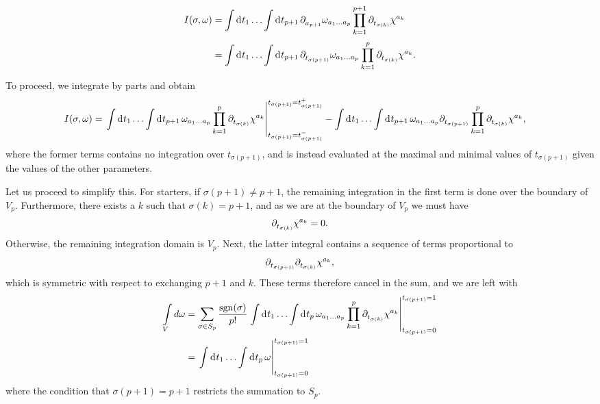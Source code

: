 \begin{align*}
I(\sigma, \omega) &= \integ{}{}{t_{1}}{\dots \integ{}{}{t_{p + 1}}{\del{a_{p + 1}}{\omega_{a_{1}\dots a_{p}}}\prod\limits_{k = 1}^{p + 1}\del{t_{\sigma(k)}}{\chi^{a_{k}}}}} \\
&= \integ{}{}{t_{1}}{\dots \integ{}{}{t_{p + 1}}{\del{t_{\sigma(p + 1)}}{\omega_{a_{1}\dots a_{p}}}\prod\limits_{k = 1}^{p}\del{t_{\sigma(k)}}{\chi^{a_{k}}}}}.
\end{align*}
To proceed, we integrate by parts and obtain
\begin{align*}
I(\sigma, \omega) &= \eval{\integ{}{}{t_{1}}{\dots \integ{}{}{t_{p + 1}}{\omega_{a_{1}\dots a_{p}}\prod\limits_{k = 1}^{p}\del{t_{\sigma(k)}}{\chi^{a_{k}}}}}}_{t_{\sigma(p + 1)} = t_{\sigma(p + 1)}^{-}}^{t_{\sigma(p + 1)} = t_{\sigma(p + 1)}^{+}} - \integ{}{}{t_{1}}{\dots \integ{}{}{t_{p + 1}}{\omega_{a_{1}\dots a_{p}}\del{t_{\sigma(p + 1)}}{\prod\limits_{k = 1}^{p}\del{t_{\sigma(k)}}{\chi^{a_{k}}}}}},
\end{align*}
where the former terms contains no integration over $t_{\sigma(p + 1)}$, and is instead evaluated at the maximal and minimal values of $t_{\sigma(p + 1)}$ given the values of the other parameters.

Let us proceed to simplify this. For starters, if $\sigma(p + 1) \neq p + 1$, the remaining integration in the first term is done over the boundary of $V_{p}$. Furthermore, there exists a $k$ such that $\sigma(k) = p + 1$, and as we are at the boundary of $V_{p}$ we must have
\begin{align*}
\partial^{}_{t_{\sigma(k)}}\chi^{a_{k}} = 0.
\end{align*}
Otherwise, the remaining integration domain is $V_{p}$. Next, the latter integral contains a sequence of terms proportional to
\begin{align*}
\partial^{}_{t_{\sigma(p + 1)}}\partial^{}_{t_{\sigma(k)}}\chi^{a_{k}},
\end{align*}
which is symmetric with respect to exchanging $p + 1$ and $k$. These terms therefore cancel in the sum, and we are left with
\begin{align*}
\minteg{V}{d\omega} &= \sum\limits_{\sigma\in S_{p}}\frac{\text{sgn}(\sigma)}{p!}\eval{\integ{}{}{t_{1}}{\dots \integ{}{}{t_{p}}{\omega_{a_{1}\dots a_{p}}\prod\limits_{k = 1}^{p}\del{t_{\sigma(k)}}{\chi^{a_{k}}}}}}_{t_{\sigma(p + 1)} = 0}^{t_{\sigma(p + 1)} = 1} \\
&= \eval{\integ{}{}{t_{1}}{\dots \integ{}{}{t_{p}}{\omega}}}_{t_{\sigma(p + 1)} = 0}^{t_{\sigma(p + 1)} = 1}
\end{align*}
where the condition that $\sigma(p + 1) = p + 1$ restricts the summation to $S_{p}$.

